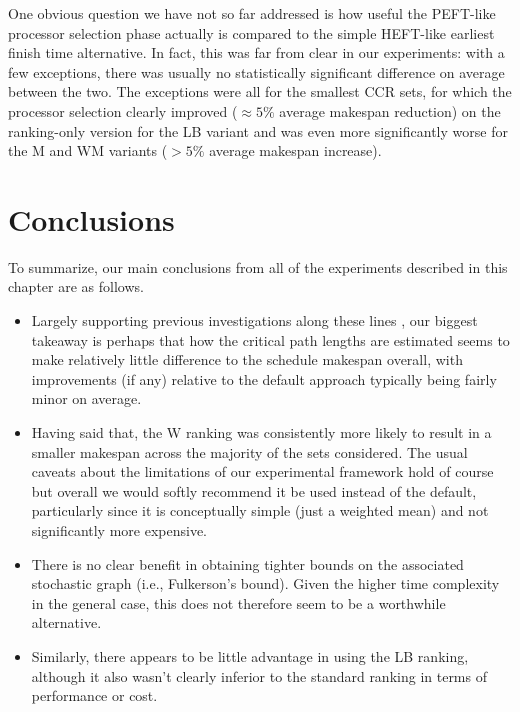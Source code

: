 \documentclass[12pt]{article}
\begin{document}
One obvious question we have not so far addressed is how useful the PEFT-like processor selection phase actually is compared to the simple HEFT-like earliest finish time alternative. In fact, this was far from clear in our experiments: with a few exceptions, there was usually no statistically significant difference on average between the two. The exceptions were all for the smallest CCR sets, for which the processor selection clearly improved ($\approx 5\%$ average makespan reduction) on the ranking-only version for the LB variant and was even more significantly worse for the M and WM variants ($> 5\%$ average makespan increase).  

\section{Conclusions}
\label{sect.conclusions}

To summarize, our main conclusions from all of the experiments described in this chapter are as follows.
\begin{itemize}
	\item Largely supporting previous investigations along these lines \cite{zhao03}, our biggest takeaway is perhaps that how the critical path lengths are estimated seems to make relatively little difference to the schedule makespan overall, with improvements (if any) relative to the default approach typically being fairly minor on average.
	\item Having said that, the W ranking was consistently more likely to result in a smaller makespan across the majority of the sets considered. The usual caveats about the limitations of our experimental framework hold of course but overall we would softly recommend it be used instead of the default, particularly since it is conceptually simple (just a weighted mean) and not significantly more expensive.
	\item There is no clear benefit in obtaining tighter bounds on the associated stochastic graph (i.e., Fulkerson's bound). Given the higher time complexity in the general case, this does not therefore seem to be a worthwhile alternative.    
	\item Similarly, there appears to be little advantage in using the LB ranking, although it also wasn't clearly inferior to the standard ranking in terms of performance or cost.  
\end{itemize} 






\end{document}
